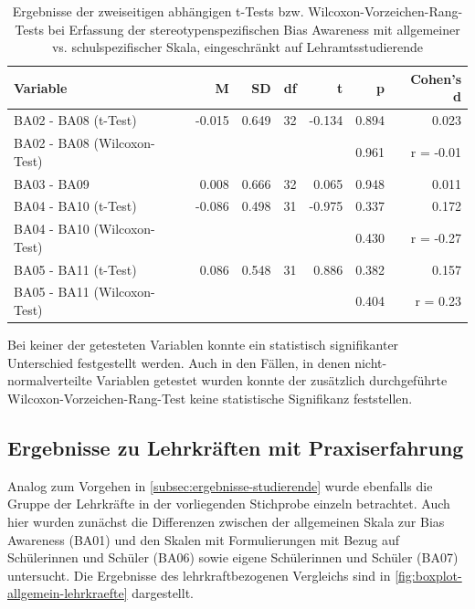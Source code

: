 \begin{table}[h!]
	\begin{tabularx}{\textwidth}{X | r | r | r | r | r | r}
		\hline
		Variable & M & SD & df & t & p & Cohen's d\\
		\hline
		BA02 - BA08 (t-Test) & -0.015 & 0.649 & 32 & -0.134 & 0.894 & 0.023\\
		BA02 - BA08 (Wilcoxon-Test) & & & & & 0.961 & r = -0.01\\
		BA03 - BA09 & 0.008 & 0.666 & 32 & 0.065 & 0.948 & 0.011\\
		BA04 - BA10 (t-Test) & -0.086 & 0.498 & 31 & -0.975 & 0.337 & 0.172\\
		BA04 - BA10 (Wilcoxon-Test) & & & & & 0.430 & r = -0.27\\
		BA05 - BA11 (t-Test) & 0.086 & 0.548 & 31 & 0.886 & 0.382 & 0.157\\
		BA05 - BA11 (Wilcoxon-Test) & & & & & 0.404 & r = 0.23\\
		\hline
	\end{tabularx}
	\caption{Ergebnisse der zweiseitigen abhängigen t-Tests bzw. Wilcoxon-Vorzeichen-Rang-Tests bei Erfassung der stereotypenspezifischen Bias Awareness mit allgemeiner vs. schulspezifischer Skala, eingeschränkt auf Lehramtsstudierende}
	\label{tab:t-tests-stereotypen-studierende}
\end{table}

Bei keiner der getesteten Variablen konnte ein statistisch signifikanter Unterschied festgestellt werden.
Auch in den Fällen, in denen nicht-normalverteilte Variablen getestet wurden konnte der zusätzlich durchgeführte Wilcoxon-Vorzeichen-Rang-Test keine statistische Signifikanz feststellen.

\subsection{Ergebnisse zu Lehrkräften mit Praxiserfahrung}
\label{subsec:ergebnisse-lehrkraefte}

Analog zum Vorgehen in \autoref{subsec:ergebnisse-studierende} wurde ebenfalls die Gruppe der Lehrkräfte in der vorliegenden Stichprobe einzeln betrachtet.
Auch hier wurden zunächst die Differenzen zwischen der allgemeinen Skala zur Bias Awareness (BA01) und den Skalen mit Formulierungen mit Bezug auf Schülerinnen und Schüler (BA06) sowie eigene Schülerinnen und Schüler (BA07) untersucht.
Die Ergebnisse des lehrkraftbezogenen Vergleichs sind in \autoref{fig:boxplot-allgemein-lehrkraefte} dargestellt.

